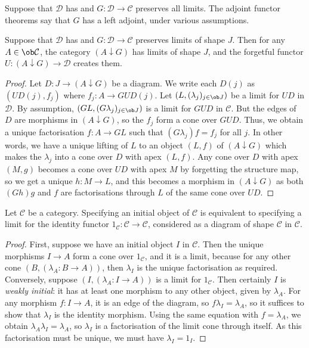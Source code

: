 Suppose that \( \mathcal D \) has and \( G : \mathcal D \to \mathcal C \) preserves all limits.
The adjoint functor theorems say that \( G \) has a left adjoint, under various assumptions.
\begin{lemma}
    Suppose that \( \mathcal D \) has and \( G : \mathcal D \to \mathcal C \) preserves limits of shape \( J \).
    Then for any \( A \in \ob \mathcal C \), the category \( (A \downarrow G) \) has limits of shape \( J \), and the forgetful functor \( U : (A \downarrow G) \to \mathcal D \) creates them.
\end{lemma}
\begin{proof}
    Let \( D : J \to (A \downarrow G) \) be a diagram.
    We write each \( D(j) \) as \( (UD(j), f_j) \) where \( f_j : A \to GUD(j) \).
    Let \( (L, (\lambda_j)_{j \in \ob J}) \) be a limit for \( UD \) in \( \mathcal D \).
    By assumption, \( (GL, (G\lambda_j)_{j \in \ob J}) \) is a limit for \( GUD \) in \( \mathcal C \).
    But the edges of \( D \) are morphisms in \( (A \downarrow G) \), so the \( f_j \) form a cone over \( GUD \).
    Thus, we obtain a unique factorisation \( f : A \to GL \) such that \( (G\lambda_j) f = f_j \) for all \( j \).
    In other words, we have a unique lifting of \( L \) to an object \( (L, f) \) of \( (A \downarrow G) \) which makes the \( \lambda_j \) into a cone over \( D \) with apex \( (L, f) \).
    Any cone over \( D \) with apex \( (M, g) \) becomes a cone over \( UD \) with apex \( M \) by forgetting the structure map, so we get a unique \( h : M \to L \), and this becomes a morphism in \( (A \downarrow G) \) as both \( (Gh)g \) and \( f \) are factorisations through \( L \) of the same cone over \( UD \).
\end{proof}
\begin{lemma}
    Let \( \mathcal C \) be a category.
    Specifying an initial object of \( \mathcal C \) is equivalent to specifying a limit for the identity functor \( 1_{\mathcal C} : \mathcal C \to \mathcal C \), considered as a diagram of shape \( \mathcal C \) in \( \mathcal C \).
\end{lemma}
\begin{proof}
    First, suppose we have an initial object \( I \) in \( \mathcal C \).
    Then the unique morphisms \( I \to A \) form a cone over \( 1_{\mathcal C} \), and it is a limit, because for any other cone \( (B, (\lambda_A : B \to A)) \), then \( \lambda_I \) is the unique factorisation as required.
    Conversely, suppose \( (I, (\lambda_A : I \to A)) \) is a limit for \( 1_{\mathcal C} \).
    Then certainly \( I \) is \emph{weakly initial}: it has at least one morphism to any other object, given by \( \lambda_A \).
    For any morphism \( f : I \to A \), it is an edge of the diagram, so \( f \lambda_I = \lambda_A \), so it suffices to show that \( \lambda_I \) is the identity morphism.
    Using the same equation with \( f = \lambda_A \), we obtain \( \lambda_A \lambda_I = \lambda_A \), so \( \lambda_I \) is a factorisation of the limit cone through itself.
    As this factorisation must be unique, we must have \( \lambda_I = 1_I \).
\end{proof}
